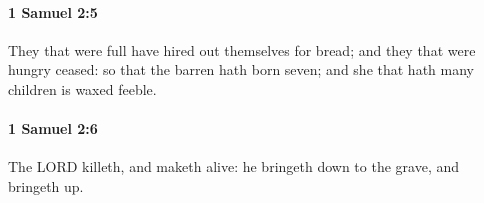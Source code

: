 		\paragraph{1 Samuel 2:5} %
			\label{1SAMUEL-2-5}

			They that were full have hired out themselves for bread; and they that were hungry ceased: so that the barren hath born seven; and she that hath many children is waxed feeble.


		\paragraph{1 Samuel 2:6} %
			\label{1SAMUEL-2-6}

			The LORD killeth, and maketh alive: he bringeth down to the grave, and bringeth up.


